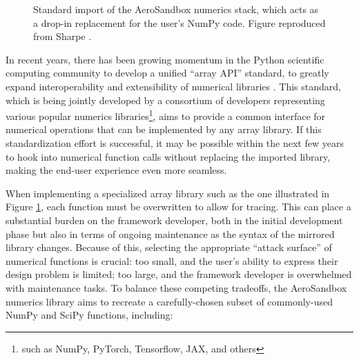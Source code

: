\begin{figure}[H]
    \centering
    
    \caption{Standard import of the AeroSandbox numerics stack, which acts as a drop-in replacement for the user's NumPy code. Figure reproduced from Sharpe \cite{sharpe_aerosandbox_2021}.}
    \label{fig:asb-np-import}
\end{figure}

In recent years, there has been growing momentum in the Python scientific computing community to develop a unified ``array API'' standard, to greatly expand interoperability and extensibility of numerical libraries \cite{array_api_2023}. This standard, which is being jointly developed by a consortium of developers representing various popular numerics libraries\footnote{such as NumPy, PyTorch, Tensorflow, JAX, and others}, aims to provide a common interface for numerical operations that can be implemented by any array library. If this standardization effort is successful, it may be possible within the next few years to hook into numerical function calls without replacing the imported library, making the end-user experience even more seamless.

When implementing a specialized array library such as the one illustrated in Figure \ref{fig:asb-np-import}, each function must be overwritten to allow for tracing. This can place a substantial burden on the framework developer, both in the initial development phase but also in terms of ongoing maintenance as the syntax of the mirrored library changes. Because of this, selecting the appropriate ``attack surface'' of numerical functions is crucial: too small, and the user's ability to express their design problem is limited; too large, and the framework developer is overwhelmed with maintenance tasks. To balance these competing tradeoffs, the AeroSandbox numerics library aims to recreate a carefully-chosen subset of commonly-used NumPy and SciPy functions, including:

